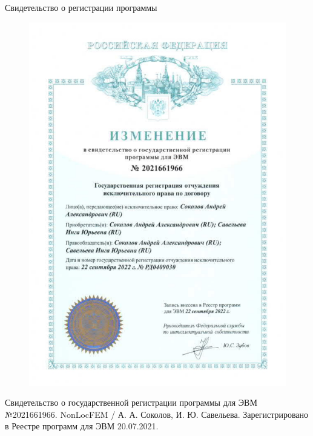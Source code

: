 \begin{frame}{Свидетельство о регистрации программы}
\begin{figure}[h]
        \includegraphics[height=0.65\textheight]{pics/RegistrationChange.pdf}
    \end{figure}
    
    Свидетельство о государственной регистрации программы для ЭВМ \\
    №2021661966. NonLocFEM / А. А. Соколов, И. Ю. Савельева. Зарегистрировано в Реестре программ для ЭВМ 20.07.2021.
\end{frame}

